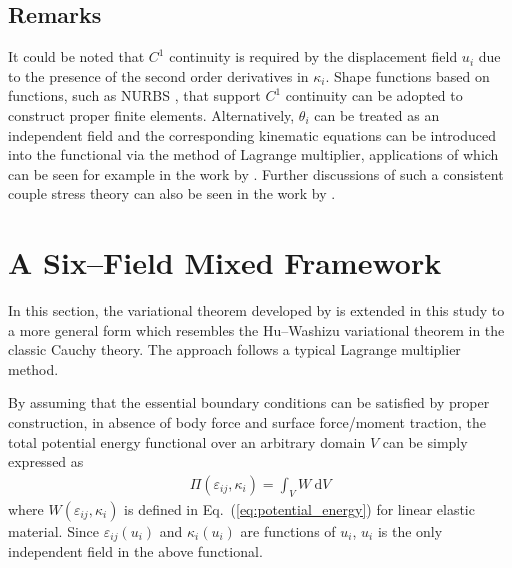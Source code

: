 \documentclass[3p,sort&compress,11pt,fleqn,review]{elsarticle}
\newcommand*{\eqsref}[1]{Eq.~(\ref{#1})}
\newcommand*{\md}[1]{\mathrm{d}#1}
\begin{document}
\subsection{Remarks}
It could be noted that $C^1$ continuity is required by the displacement field $u_i$ due to the presence of the second order derivatives in $\kappa_i$. Shape functions based on functions, such as NURBS \citep[see][]{Dargush2021}, that support $C^1$ continuity can be adopted to construct proper finite elements. Alternatively, $\theta_i$ can be treated as an independent field and the corresponding kinematic equations can be introduced into the functional via the method of Lagrange multiplier, applications of which can be seen for example in the work by \citet{Darrall2013,Deng2016,Pedgaonkar2021}. Further discussions of such a consistent couple stress theory can also be seen in the work by \citet{Hadjesfandiari2016}.
\section{A Six--Field Mixed Framework}
In this section, the variational theorem developed by \citet{Darrall2013} is extended in this study to a more general form which resembles the Hu--Washizu variational theorem in the classic Cauchy theory. The approach follows a typical Lagrange multiplier method.

By assuming that the essential boundary conditions can be satisfied by proper construction, in absence of body force and surface force/moment traction, the total potential energy functional over an arbitrary domain $V$ can be simply expressed as
\begin{gather}
\varPi\left(\varepsilon_{ij},\kappa_i\right)=\int_VW~\md{V}
\end{gather}
where $W\left(\varepsilon_{ij},\kappa_i\right)$ is defined in \eqsref{eq:potential_energy} for linear elastic material. Since $\varepsilon_{ij}\left(u_i\right)$ and $\kappa_i\left(u_i\right)$ are functions of $u_i$, $u_i$ is the only independent field in the above functional.
\end{document}
